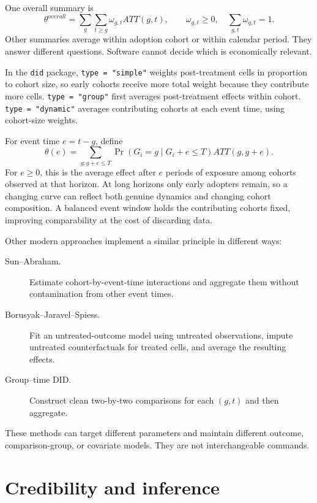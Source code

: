 One overall summary is
\begin{equation}
  \theta^{overall}=\sum_g\sum_{t\geq g}
  \omega_{g,t}ATT(g,t),
  \qquad \omega_{g,t}\geq0,\quad
  \sum_{g,t}\omega_{g,t}=1.
  \label{eq:did-overall-aggregation}
\end{equation}
Other summaries average within adoption cohort or within calendar period.  They
answer different questions.  Software cannot decide which is economically
relevant.

In the \texttt{did} package, \texttt{type = "simple"} weights post-treatment
cells in proportion to cohort size, so early cohorts receive more total weight
because they contribute more cells.  \texttt{type = "group"} first averages
post-treatment effects within cohort.  \texttt{type = "dynamic"} averages
contributing cohorts at each event time, using cohort-size weights.

For event time $e=t-g$, define
\begin{equation}
  \theta(e)=\sum_{g:g+e\leq T}
  \Pr(G_i=g\mid G_i+e\leq T)ATT(g,g+e).
  \label{eq:did-dynamic-aggregation}
\end{equation}
For $e\geq0$, this is the average effect after $e$ periods of exposure among
cohorts observed at that horizon.  At long horizons only early adopters remain,
so a changing curve can reflect both genuine dynamics and changing cohort
composition.  A balanced event window holds the contributing cohorts fixed,
improving comparability at the cost of discarding data.

Other modern approaches implement a similar principle in different ways:
\begin{description}
  \item[Sun--Abraham.] Estimate cohort-by-event-time interactions and aggregate
  them without contamination from other event times.
  \item[Borusyak--Jaravel--Spiess.] Fit an untreated-outcome model using
  untreated observations, impute untreated counterfactuals for treated cells,
  and average the resulting effects.
  \item[Group--time DID.] Construct clean two-by-two comparisons for each
  $(g,t)$ and then aggregate.
\end{description}
These methods can target different parameters and maintain different outcome,
comparison-group, or covariate models.  They are not interchangeable commands.

\section{Credibility and inference}
\label{sec:did-inference}

